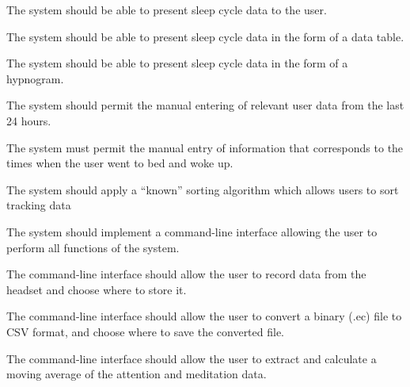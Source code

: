 \begin{reqtable}
  {The system should be able to present sleep cycle data to the user.}
  \phigh
  \deps{\ref{sreq:present-data-table},\ref{sreq:present-hypnogram}}

  {The system should be able to present sleep cycle data in the form of a data table.}
  \phigh
  \deps{\ref{req:extract-data}}

  {The system should be able to present sleep cycle data in the form of a hypnogram.}
  \phigh
  \deps{\ref{req:extract-data}}

  {The system should permit the manual entering of relevant user data from the last 24 hours.}
  \pmed
  \deps{\ref{req:manual-entry-bed-woke}}

  {The system must permit the manual entry of information that corresponds to the times when the
    user went to bed and woke up.}
  \pmed
  \dnone

  {The system should apply a ``known'' sorting algorithm which allows users to sort tracking data}
  \pmed
  \deps{\ref{req:store-data}}
  \sspec

  {The system should implement a command-line interface allowing the user to perform all functions
    of the system.}
  \phigh
  \deps{\ref{sreq:allow-user-record-data}, \ref{sreq:allow-user-change-format},
    \ref{sreq:allow-user-extract-calculate}}

  {The command-line interface should allow the user to record data from the headset and choose where
    to store it.}
  \phigh
  \deps{\ref{sreq:read-data-headset}, \ref{sreq:facilitate-saving}}

  {The command-line interface should allow the user to convert a binary (.ec) file to CSV format,
    and choose where to save the converted file.}
  \phigh
  \deps{\ref{sreq:facilitate-conversion}}

  {The command-line interface should allow the user to extract and calculate a moving average of the
    attention and meditation data.}
  \phigh
  \deps{\ref{req:extract-data}}


\end{reqtable}
